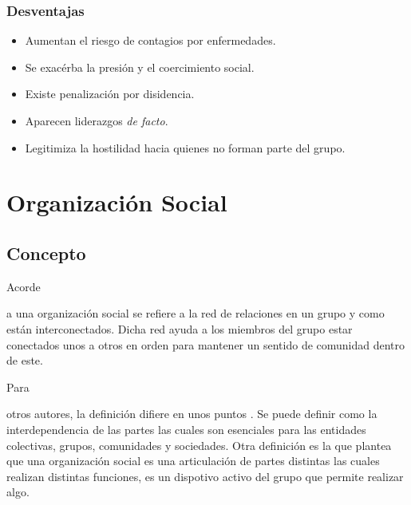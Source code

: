 \documentclass[stu, 12pt, letterpaper, donotrepeattitle, floatsintext, natbib]{apa7}
\begin{document}
\subsubsection{Desventajas}
\begin{justifying}
    \begin{itemize}
        \item Aumentan el riesgo de contagios por enfermedades.
        \item Se exacérba la presión y el coercimiento social.
        \item Existe penalización por disidencia.
        \item Aparecen liderazgos \emph{de facto}.
        \item Legitimiza la hostilidad hacia quienes no forman parte del grupo.
    \end{itemize}
\end{justifying}
\section{Organización Social}
\subsection{Concepto}
Acorde \begin{justifying}
    a \cite{unknown-author-no-date} %
    una organización social se refiere a la red de relaciones en un grupo y como están interconectados.
    Dicha red ayuda a los miembros del grupo estar conectados unos a otros en orden para mantener un sentido
    de comunidad dentro de este.\par
\end{justifying}
Para \begin{justifying}
    otros autores, la definición difiere en unos puntos \citep{unknown-author-2020A}. %
    Se puede definir como la interdependencia de las partes las cuales son esenciales para las entidades colectivas, grupos, 
    comunidades y sociedades. Otra definición es la que plantea que una organización social es una articulación de partes distintas las cuales 
    realizan distintas funciones, es un dispotivo activo del grupo que permite realizar algo.\par
\end{justifying}
\vspace{\baselineskip}
\end{document}
